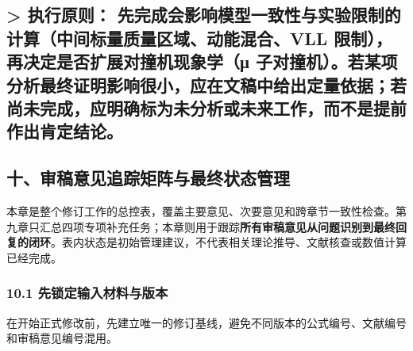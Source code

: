 \documentclass[
]{article}
\begin{document}
\subsection{\texorpdfstring{\textgreater{} \textbf{执行原则：}
先完成会影响模型一致性与实验限制的计算（中间标量质量区域、动能混合、VLL
限制），再决定是否扩展对撞机现象学（μ
子对撞机）。若某项分析最终证明影响很小，应在文稿中给出定量依据；若尚未完成，应明确标为未分析或未来工作，而不是提前作出肯定结论。}{\textgreater{} 执行原则： 先完成会影响模型一致性与实验限制的计算（中间标量质量区域、动能混合、VLL 限制），再决定是否扩展对撞机现象学（μ 子对撞机）。若某项分析最终证明影响很小，应在文稿中给出定量依据；若尚未完成，应明确标为未分析或未来工作，而不是提前作出肯定结论。}}\label{ux6267ux884cux539fux5219-ux5148ux5b8cux6210ux4f1aux5f71ux54cdux6a21ux578bux4e00ux81f4ux6027ux4e0eux5b9eux9a8cux9650ux5236ux7684ux8ba1ux7b97ux4e2dux95f4ux6807ux91cfux8d28ux91cfux533aux57dfux52a8ux80fdux6df7ux5408vll-ux9650ux5236ux518dux51b3ux5b9aux662fux5426ux6269ux5c55ux5bf9ux649eux673aux73b0ux8c61ux5b66ux3bc-ux5b50ux5bf9ux649eux673aux82e5ux67d0ux9879ux5206ux6790ux6700ux7ec8ux8bc1ux660eux5f71ux54cdux5f88ux5c0fux5e94ux5728ux6587ux7a3fux4e2dux7ed9ux51faux5b9aux91cfux4f9dux636eux82e5ux5c1aux672aux5b8cux6210ux5e94ux660eux786eux6807ux4e3aux672aux5206ux6790ux6216ux672aux6765ux5de5ux4f5cux800cux4e0dux662fux63d0ux524dux4f5cux51faux80afux5b9aux7ed3ux8bba}

\subsection{十、审稿意见追踪矩阵与最终状态管理}\label{ux5341ux5ba1ux7a3fux610fux89c1ux8ffdux8e2aux77e9ux9635ux4e0eux6700ux7ec8ux72b6ux6001ux7ba1ux7406}

本章是整个修订工作的总控表，覆盖主要意见、次要意见和跨章节一致性检查。第九章只汇总四项专项补充任务；本章则用于跟踪\textbf{所有审稿意见从问题识别到最终回复的闭环}。表内状态是初始管理建议，不代表相关理论推导、文献核查或数值计算已经完成。

\subsubsection{10.1
先锁定输入材料与版本}\label{ux5148ux9501ux5b9aux8f93ux5165ux6750ux6599ux4e0eux7248ux672c}

在开始正式修改前，先建立唯一的修订基线，避免不同版本的公式编号、文献编号和审稿意见编号混用。
\end{document}
